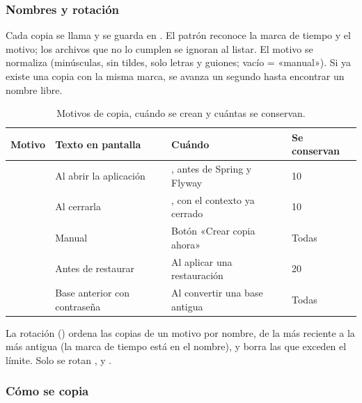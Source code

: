 \subsubsection{Nombres y rotación}

Cada copia se llama  y se guarda en . El patrón
 reconoce la marca de tiempo y el motivo; los archivos que no lo cumplen se
ignoran al listar. El motivo se normaliza (minúsculas, sin tildes, solo letras y guiones; vacío = «manual»). Si ya
existe una copia con la misma marca, se avanza un segundo hasta encontrar un nombre libre.

\begin{table}[H]
	\centering
	\caption{Motivos de copia, cuándo se crean y cuántas se conservan.}
	\label{tab:bd-motivos}
	\begin{tabular}{L{3.7cm}L{2.8cm}L{4.4cm}L{2.2cm}}
		\hline
		\textbf{Motivo} & \textbf{Texto en pantalla} & \textbf{Cuándo} & \textbf{Se conservan} \\ \hline
		 & Al abrir la aplicación & , antes de Spring y Flyway & 10 \\
		 & Al cerrarla & , con el contexto ya cerrado & 10 \\
		 & Manual & Botón «Crear copia ahora» & Todas \\
		 & Antes de restaurar & Al aplicar una restauración & 20 \\
		 & Base anterior con contraseña & Al convertir una base antigua & Todas \\ \hline
	\end{tabular}
\end{table}

La rotación () ordena las copias de un motivo por nombre, de la más reciente a la más antigua
(la marca de tiempo está en el nombre), y borra las que exceden el límite. Solo se rotan , 
y .

\subsubsection{Cómo se copia}

